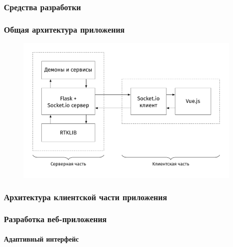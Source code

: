 \documentclass[xetex,t]{beamer}
\begin{document}
%
%
\begin{frame}
  \frametitle{Средства разработки}
\end{frame}


%
%
\begin{frame}
  \frametitle{Общая архитектура приложения}
  \vskip -0.75cm
  \begin{figure}[h]
    \centering
    \includegraphics[width=.95\textwidth]{../img/tikz/system-architecture/pic_sans_no-border}
  \end{figure}
\end{frame}


%
%
\begin{frame}
  \frametitle{Архитектура клиентской части приложения}
\end{frame}


%
%
\begin{frame}
  \frametitle{Разработка веб-приложения}
  \framesubtitle{Адаптивный интерфейс}
\end{frame}


\end{document}
